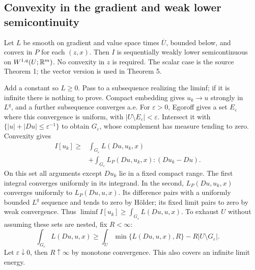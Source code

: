 \subsection{Convexity in the gradient and weak lower semicontinuity}
\Needspace{55mm}
\begin{theorem}
\label{thm:8-lsc}
Let $L$ be smooth on gradient and value space times $\overline U$, bounded
below, and convex in $P$ for each $(z,x)$. Then $I$ is sequentially weakly
lower semicontinuous on $W^{1,q}(U;\mathbb{R}^m)$.
No convexity in $z$ is required. The scalar case is the source Theorem 1;
the vector version is used in Theorem 5.
\end{theorem}
\begin{expandedproof}
Add a constant so $L\geq0$. Pass to a subsequence realizing the liminf;
if it is infinite there is nothing to prove. Compact embedding gives
$u_k\to u$ strongly in $L^q$, and a further subsequence converges a.e.
For $\varepsilon>0$, Egoroff gives a set $E_\varepsilon$ where this
convergence is uniform, with $|U\setminus E_\varepsilon|<\varepsilon$.
Intersect it with $\{|u|+|Du|\leq\varepsilon^{-1}\}$ to obtain
$G_\varepsilon$, whose complement has measure tending to zero.
Convexity gives
\[
 \begin{split}
 I[u_k]\geq{}&\int_{G_\varepsilon}L(Du,u_k,x)\\
 &+\int_{G_\varepsilon}L_P(Du,u_k,x):(Du_k-Du).
 \end{split}
\]
On this set all arguments except $Du_k$ lie in a fixed compact range.
The first integral converges uniformly in its integrand. In the second,
$L_P(Du,u_k,x)$ converges uniformly to $L_P(Du,u,x)$.
Its difference pairs with a uniformly bounded $L^q$ sequence and tends
to zero by H\"older; its fixed limit pairs to zero by weak convergence.
Thus $\liminf I[u_k]\geq\int_{G_\varepsilon}L(Du,u,x)$.
To exhaust $U$ without assuming these sets are nested, fix $R<\infty$:
\[
 \int_{G_\varepsilon}L(Du,u,x)
 \geq\int_U\min\{L(Du,u,x),R\}-R|U\setminus G_\varepsilon|.
\]
Let $\varepsilon\downarrow0$, then $R\uparrow\infty$ by monotone
convergence. This also covers an infinite limit energy.
\end{expandedproof}
\Needspace{55mm}

